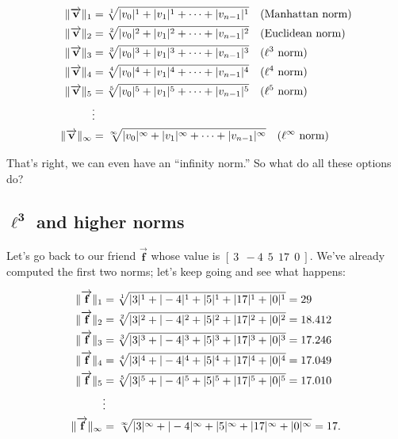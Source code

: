 \vspace{-.15in}
\begin{align*}
\lVert\overrightarrow{\textbf{v}}\rVert_1 &= \sqrt[1]{|v_0|^1 + |v_1|^1 + \cdots +
|v_{n-1}|^1} \quad \textrm{(Manhattan norm)}\\
\lVert\overrightarrow{\textbf{v}}\rVert_2 &= \sqrt[2]{|v_0|^2 + |v_1|^2 + \cdots +
|v_{n-1}|^2} \quad \textrm{(Euclidean norm)}\\
\lVert\overrightarrow{\textbf{v}}\rVert_3 &= \sqrt[3]{|v_0|^3 + |v_1|^3 + \cdots +
|v_{n-1}|^3} \quad \textrm{($\ell^3$ norm)}\\
\lVert\overrightarrow{\textbf{v}}\rVert_4 &= \sqrt[4]{|v_0|^4 + |v_1|^4 + \cdots +
|v_{n-1}|^4} \quad \textrm{($\ell^4$ norm)}\\
\lVert\overrightarrow{\textbf{v}}\rVert_5 &= \sqrt[5]{|v_0|^5 + |v_1|^5 + \cdots +
|v_{n-1}|^5} \quad \textrm{($\ell^5$ norm)}\\
& \vdots \\
\lVert\overrightarrow{\textbf{v}}\rVert_\infty &= \sqrt[\infty]{|v_0|^\infty +
|v_1|^\infty + \cdots + |v_{n-1}|^\infty} \quad \textrm{($\ell^\infty$ norm)}\\
\end{align*}

That's right, we can even have an ``infinity norm.'' So what do all these options do?


\subsection{$\boldsymbol\ell^\textbf{3}$ and higher norms}

Let's go back to our friend $\overrightarrow{\textbf{f}}$ whose value
is $[\ 3\ \ -4\ \ 5\ \ 17\ \ 0\ ]$. We've already computed the first two norms;
let's keep going and see what happens:

\vspace{-.15in}
\begin{align*}
\lVert\overrightarrow{\textbf{f}}\rVert_1 &= \sqrt[1]{|3|^1 + |-4|^1 + |5|^1 + |17|^1 + |0|^1} = 29\\
\lVert\overrightarrow{\textbf{f}}\rVert_2 &= \sqrt[2]{|3|^2 + |-4|^2 + |5|^2 + |17|^2 + |0|^2} = 18.412\\
\lVert\overrightarrow{\textbf{f}}\rVert_3 &= \sqrt[3]{|3|^3 + |-4|^3 + |5|^3 + |17|^3 + |0|^3} = 17.246\\
\lVert\overrightarrow{\textbf{f}}\rVert_4 &= \sqrt[4]{|3|^4 + |-4|^4 + |5|^4 + |17|^4 + |0|^4} = 17.049\\
\lVert\overrightarrow{\textbf{f}}\rVert_5 &= \sqrt[5]{|3|^5 + |-4|^5 + |5|^5 + |17|^5 + |0|^5} = 17.010\\
& \vdots \\
\lVert\overrightarrow{\textbf{f}}\rVert_\infty &= \sqrt[\infty]{|3|^\infty + |-4|^\infty + |5|^\infty + |17|^\infty + |0|^\infty} = 17.\\
\end{align*}

